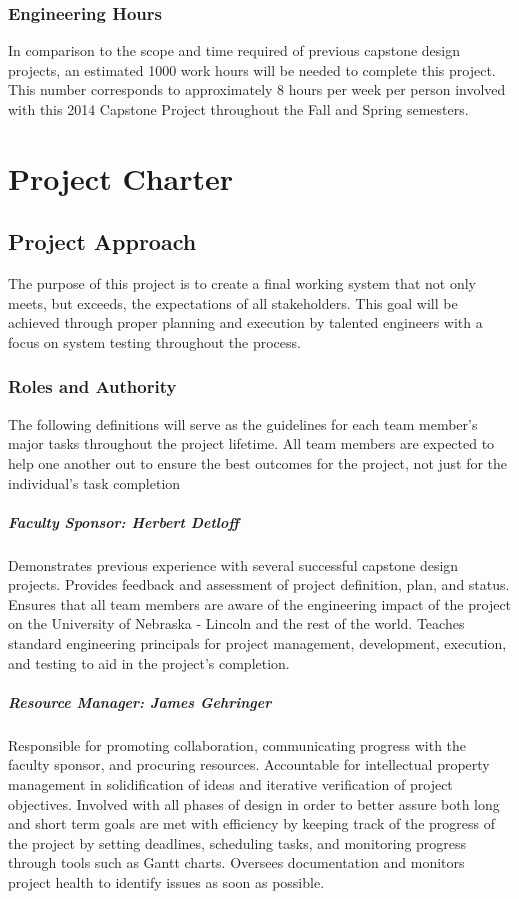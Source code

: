 \documentclass[11pt]{report}
\begin{document}
\subsection{Engineering Hours}
In comparison to the scope and time required of previous capstone design projects, an estimated 1000 work hours will be needed to complete this project.
This number corresponds to approximately 8 hours per week per person involved with this 2014 Capstone Project throughout the Fall and Spring semesters.

\chapter{Project Charter}
\section{Project Approach}
The purpose of this project is to create a final working system that not only meets, but exceeds, the expectations of all stakeholders. This goal will be achieved through proper planning and execution by talented engineers with a focus on system testing throughout the process.

\subsection{Roles and Authority}
The following definitions will serve as the guidelines for each team member's major tasks throughout the project lifetime. All team members are expected to help one another out to ensure the best outcomes for the project, not just for the individual's task completion
\paragraph{Faculty Sponsor: Herbert Detloff}
Demonstrates previous experience with several successful capstone design projects.
Provides feedback and assessment of project definition, plan, and status.
Ensures that all team members are aware of the engineering impact of the project on the University of Nebraska - Lincoln and the rest of the world.
Teaches standard engineering principals for project management, development, execution, and testing to aid in the project's completion.

\paragraph{Resource Manager: James Gehringer}
Responsible for promoting collaboration, communicating progress with the faculty sponsor, and procuring resources.
Accountable for intellectual property management in solidification of ideas and iterative verification of project objectives.
Involved with all phases of design in order to better assure both long and short term goals are met with efficiency by keeping track of the progress of the project by setting deadlines, scheduling tasks, and monitoring progress through tools such as Gantt charts.
Oversees documentation and monitors project health to identify issues as soon as possible.
\end{document}
